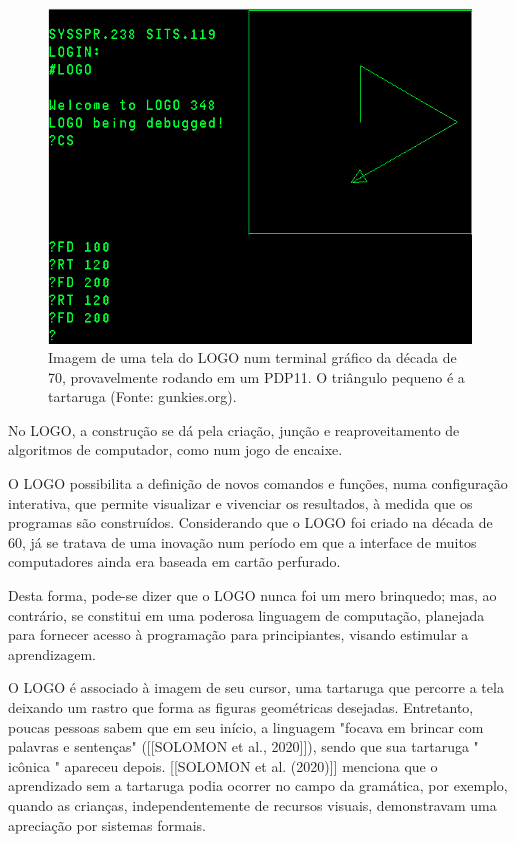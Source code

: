 \begin{figure}[htb]
\begin{minipage}[b]{0.4\linewidth}
                \includegraphics[width=1.0\linewidth]{../../../imagens/logo-PDP11.png}
                \caption{Imagem de uma tela do LOGO num terminal gráfico da década de 70, provavelmente rodando em um PDP11. O triângulo pequeno é a tartaruga (Fonte: gunkies.org).}
                \label{ca83b217b58f57e503ff496c6c6f47bee5dc77cd}
\end{minipage}
\hspace{0.5cm}
\end{figure}



No LOGO, a construção se dá pela criação, junção e reaproveitamento de algoritmos de computador, como num jogo de encaixe.

O LOGO possibilita a definição de novos comandos e funções, numa configuração interativa, que permite visualizar e vivenciar os resultados, à medida que os programas são construídos. Considerando que o LOGO foi criado na década de 60, já se tratava de uma inovação num período em que a interface de muitos computadores ainda era baseada em cartão perfurado.

Desta forma, pode-se dizer que o LOGO nunca foi um mero brinquedo; mas, ao contrário, se constitui em uma poderosa linguagem de computação, planejada para fornecer acesso à programação para principiantes, visando estimular a aprendizagem.

O LOGO é associado à imagem de seu cursor, uma tartaruga que percorre a tela deixando um rastro que forma as figuras geométricas desejadas. Entretanto, poucas pessoas sabem que em seu início, a linguagem "focava em brincar com palavras e sentenças" ([[SOLOMON et al., 2020]]), sendo que sua tartaruga " icônica " apareceu depois.  [[SOLOMON et al. (2020)]] menciona que o aprendizado sem a tartaruga podia ocorrer no campo da gramática, por exemplo, quando as crianças, independentemente de recursos visuais, demonstravam uma apreciação por sistemas formais.

